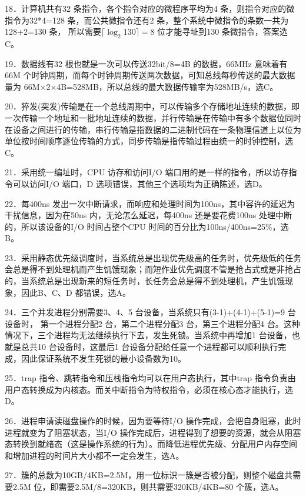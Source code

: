 \documentclass[UTF8,11pt]{ctexart}
\begin{document}
18．计算机共有32 条指令，各个指令对应的微程序平均为4 条，则指令对应的微指令为32*4=128 条，而公共微指令还有2 条，整个系统中微指令的条数一共为128+2=130 条， 所以需要\(\displaystyle \lceil\log_2 130\rceil=8\) 位才能寻址到130 条微指令，答案选C。


19．数据线有32 根也就是一次可以传送32bit/8=4B 的数据，66MHz 意味着有66M 个时钟周期，而每个时钟周期传送两次数据，可知总线每秒传送的最大数据量为 66M×2×4B=528MB，所以总线的最大数据传输率为528MB/s，选C。


20．猝发(突发)传输是在一个总线周期中，可以传输多个存储地址连续的数据，即一次传输一个地址和一批地址连续的数据，并行传输是在传输中有多个数据位同时在设备之间进行的传输，串行传输是指数据的二进制代码在一条物理信道上以位为单位按时间顺序逐位传输的方式，同步传输是指传输过程由统一的时钟控制，选C。


21．采用统一编址时，CPU 访存和访问I/O 端口用的是一样的指令，所以访存指令可以访问I/O 端口，D 选项错误，其他三个选项均为正确陈述，选D。


22．每400ns 发出一次中断请求，而响应和处理时间为100ns，其中容许的延迟为干扰信息，因为在50ns 内，无论怎么延迟，每400ns 还是要花费100ns 处理中断的，所以该设备的I/O 时间占整个CPU 时间的百分比为100ns/400ns=25\%，选B。


23．采用静态优先级调度时，当系统总是出现优先级高的任务时，优先级低的任务会总是得不到处理机而产生饥饿现象；而短作业优先调度不管是抢占式或是非抢占的，当系统总是出现新来的短任务时，长任务会总是得不到处理机，产生饥饿现象，因此B、C、D 都错误，选A。


24．三个并发进程分别需要3、4、5 台设备，当系统只有(3-1)+(4-1)+(5-1)=9 台设备时， 第一个进程分配2 台，第二个进程分配3 台，第三个进程分配4 台。这种情况下，三个进程均无法继续执行下去，发生死锁。当系统中再增加1 台设备，也就是总共10 台设备时，这最后1 台设备分配给任意一个进程都可以顺利执行完成，因此保证系统不发生死锁的最小设备数为10。


25．trap 指令、跳转指令和压栈指令均可以在用户态执行，其中trap 指令负责由用户态转换成为内核态。而关中断指令为特权指令，必须在核心态才能执行，选D。


26．进程申请读磁盘操作的时候，因为要等待I/O 操作完成，会把自身阻塞，此时进程就变为了阻塞状态，当I/O 操作完成后，进程得到了想要的资源，就会从阻塞态转换到就绪态（这是操作系统的行为）。而降低进程优先级、分配用户内存空间和增加进程的时间片大小都不一定会发生，选A。


27．簇的总数为10GB/4KB=2.5M，用一位标识一簇是否被分配，则整个磁盘共需要2.5M 位，即需要2.5M/8=320KB，则共需要320KB/4KB=80 个簇，选A。
\end{document}
